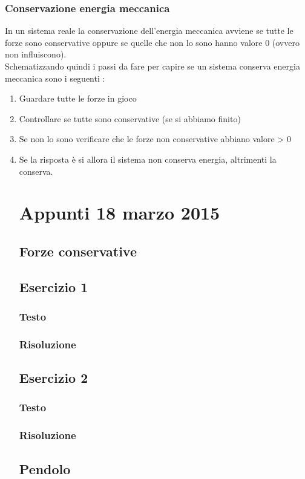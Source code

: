 \documentclass[portait]{article}
\begin{document}
\subsubsection{Conservazione energia meccanica}
In un sistema reale la conservazione dell'energia meccanica avviene se tutte le forze sono conservative oppure se quelle che non lo sono hanno valore 0 (ovvero non influiscono). \\
Schematizzando quindi i passi da fare per capire se un sistema conserva energia meccanica sono i seguenti : 
\begin{enumerate}
\item Guardare tutte le forze in gioco
\item Controllare se tutte sono conservative (se si abbiamo finito)
\item Se non lo sono verificare che le forze non conservative abbiano valore > 0 
\item Se la risposta è si allora il sistema non conserva energia, altrimenti la conserva.
\section{Appunti 18 marzo 2015}
\subsection{Forze conservative}

\subsection{Esercizio 1}
\subsubsection{Testo}
\subsubsection{Risoluzione}
\subsection{Esercizio 2}
\subsubsection{Testo}
\subsubsection{Risoluzione}
\subsection{Pendolo}

\end{enumerate}
\end{document}
